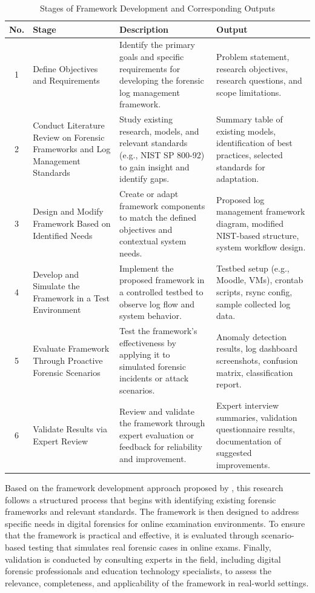 \begin{table}[H]
	\centering
	\caption{Stages of Framework Development and Corresponding Outputs}
	\begin{tabular}{|c|p{4cm}|p{6.5cm}|p{5cm}|}
		\hline
		\textbf{No.} & \textbf{Stage} & \textbf{Description} & \textbf{Output} \\
		\hline
		1 & Define Objectives and Requirements & Identify the primary goals and specific requirements for developing the forensic log management framework. & Problem statement, research objectives, research questions, and scope limitations. \\
		\hline
		2 & Conduct Literature Review on Forensic Frameworks and Log Management Standards & Study existing research, models, and relevant standards (e.g., NIST SP 800-92) to gain insight and identify gaps. & Summary table of existing models, identification of best practices, selected standards for adaptation. \\
		\hline
		3 & Design and Modify Framework Based on Identified Needs & Create or adapt framework components to match the defined objectives and contextual system needs. & Proposed log management framework diagram, modified NIST-based structure, system workflow design. \\
		\hline
		4 & Develop and Simulate the Framework in a Test Environment & Implement the proposed framework in a controlled testbed to observe log flow and system behavior. & Testbed setup (e.g., Moodle, VMs), crontab scripts, rsync config, sample collected log data. \\
		\hline
		5 & Evaluate Framework Through Proactive Forensic Scenarios & Test the framework’s effectiveness by applying it to simulated forensic incidents or attack scenarios. & Anomaly detection results, log dashboard screenshots, confusion matrix, classification report. \\
		\hline
		6 & Validate Results via Expert Review & Review and validate the framework through expert evaluation or feedback for reliability and improvement. & Expert interview summaries, validation questionnaire results, documentation of suggested improvements. \\
		\hline
	\end{tabular}
	\label{tab:framework_dev_with_output}
\end{table}


Based on the framework development approach proposed by \citet{adel2024ethicore}, this research follows a structured process that begins with identifying existing forensic frameworks and relevant standards. The framework is then designed to address specific needs in digital forensics for online examination environments. To ensure that the framework is practical and effective, it is evaluated through scenario-based testing that simulates real forensic cases in online exams. Finally, validation is conducted by consulting experts in the field, including digital forensic professionals and education technology specialists, to assess the relevance, completeness, and applicability of the framework in real-world settings.

